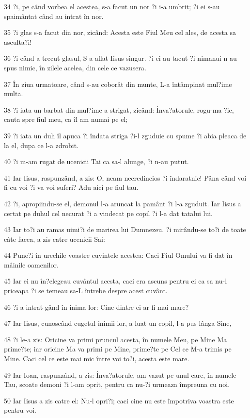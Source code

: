 \par 34 ?i, pe când vorbea el acestea, s-a facut un nor ?i i-a umbrit; ?i ei s-au spaimântat când au intrat în nor.
\par 35 ?i glas s-a facut din nor, zicând: Acesta este Fiul Meu cel ales, de acesta sa asculta?i!
\par 36 ?i când a trecut glasul, S-a aflat Iisus singur. ?i ei au tacut ?i nimanui n-au spus nimic, în zilele acelea, din cele ce vazusera.
\par 37 În ziua urmatoare, când s-au coborât din munte, L-a întâmpinat mul?ime multa.
\par 38 ?i iata un barbat din mul?ime a strigat, zicând: Înva?atorule, rogu-ma ?ie, cauta spre fiul meu, ca îl am numai pe el;
\par 39 ?i iata un duh îl apuca ?i îndata striga ?i-l zguduie cu spume ?i abia pleaca de la el, dupa ce l-a zdrobit.
\par 40 ?i m-am rugat de ucenicii Tai ca sa-l alunge, ?i n-au putut.
\par 41 Iar Iisus, raspunzând, a zis: O, neam necredincios ?i îndaratnic! Pâna când voi fi cu voi ?i va voi suferi? Adu aici pe fiul tau.
\par 42 ?i, apropiindu-se el, demonul l-a aruncat la pamânt ?i l-a zguduit. Iar Iisus a certat pe duhul cel necurat ?i a vindecat pe copil ?i l-a dat tatalui lui.
\par 43 Iar to?i au ramas uimi?i de marirea lui Dumnezeu. ?i mirându-se to?i de toate câte facea, a zis catre ucenicii Sai:
\par 44 Pune?i în urechile voastre cuvintele acestea: Caci Fiul Omului va fi dat în mâinile oamenilor.
\par 45 Iar ei nu în?elegeau cuvântul acesta, caci era ascuns pentru ei ca sa nu-l priceapa ?i se temeau sa-L întrebe despre acest cuvânt.
\par 46 ?i a intrat gând în inima lor: Cine dintre ei ar fi mai mare?
\par 47 Iar Iisus, cunoscând cugetul inimii lor, a luat un copil, l-a pus lânga Sine,
\par 48 ?i le-a zis: Oricine va primi pruncul acesta, în numele Meu, pe Mine Ma prime?te; iar oricine Ma va primi pe Mine, prime?te pe Cel ce M-a trimis pe Mine. Caci cel ce este mai mic între voi to?i, acesta este mare.
\par 49 Iar Ioan, raspunzând, a zis: Înva?atorule, am vazut pe unul care, în numele Tau, scoate demoni ?i l-am oprit, pentru ca nu-?i urmeaza împreuna cu noi.
\par 50 Iar Iisus a zis catre el: Nu-l opri?i; caci cine nu este împotriva voastra este pentru voi.
